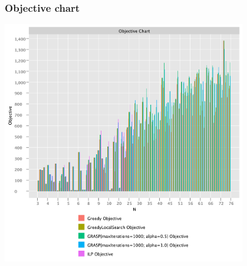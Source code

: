 \documentclass{beamer}
\begin{document}
\begin{frame}
\frametitle{Objective chart}
\includegraphics[width=0.8\textwidth]{./documentation/assets/objectiveChart.pdf}
\end{frame}
\end{document}

